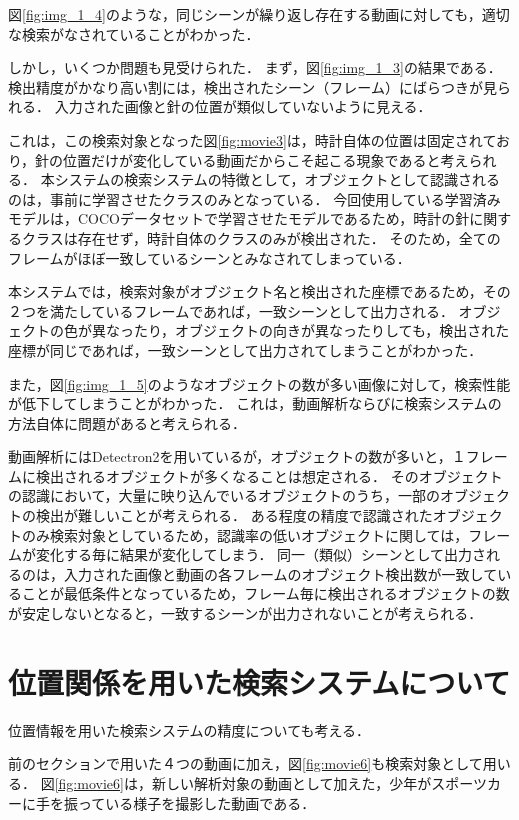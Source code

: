 \documentclass[a4j,12pt,dvipdfmx]{jreport}
\begin{document}
図\ref{fig:img_1_4}のような，同じシーンが繰り返し存在する動画に対しても，適切な検索がなされていることがわかった．

しかし，いくつか問題も見受けられた．
まず，図\ref{fig:img_1_3}の結果である．
検出精度がかなり高い割には，検出されたシーン（フレーム）にばらつきが見られる．
入力された画像と針の位置が類似していないように見える．

これは，この検索対象となった図\ref{fig:movie3}は，時計自体の位置は固定されており，針の位置だけが変化している動画だからこそ起こる現象であると考えられる．
本システムの検索システムの特徴として，オブジェクトとして認識されるのは，事前に学習させたクラスのみとなっている．
今回使用している学習済みモデルは，COCOデータセットで学習させたモデルであるため，時計の針に関するクラスは存在せず，時計自体のクラスのみが検出された．
そのため，全てのフレームがほぼ一致しているシーンとみなされてしまっている．

本システムでは，検索対象がオブジェクト名と検出された座標であるため，その２つを満たしているフレームであれば，一致シーンとして出力される．
オブジェクトの色が異なったり，オブジェクトの向きが異なったりしても，検出された座標が同じであれば，一致シーンとして出力されてしまうことがわかった．

また，図\ref{fig:img_1_5}のようなオブジェクトの数が多い画像に対して，検索性能が低下してしまうことがわかった．
これは，動画解析ならびに検索システムの方法自体に問題があると考えられる．

動画解析にはDetectron2を用いているが，オブジェクトの数が多いと，１フレームに検出されるオブジェクトが多くなることは想定される．
そのオブジェクトの認識において，大量に映り込んでいるオブジェクトのうち，一部のオブジェクトの検出が難しいことが考えられる．
ある程度の精度で認識されたオブジェクトのみ検索対象としているため，認識率の低いオブジェクトに関しては，フレームが変化する毎に結果が変化してしまう．
同一（類似）シーンとして出力されるのは，入力された画像と動画の各フレームのオブジェクト検出数が一致していることが最低条件となっているため，フレーム毎に検出されるオブジェクトの数が安定しないとなると，一致するシーンが出力されないことが考えられる．

\section{位置関係を用いた検索システムについて}
位置情報を用いた検索システムの精度についても考える．

前のセクションで用いた４つの動画に加え，図\ref{fig:movie6}も検索対象として用いる．
図\ref{fig:movie6}は，新しい解析対象の動画として加えた，少年がスポーツカーに手を振っている様子を撮影した動画である．
\end{document}
